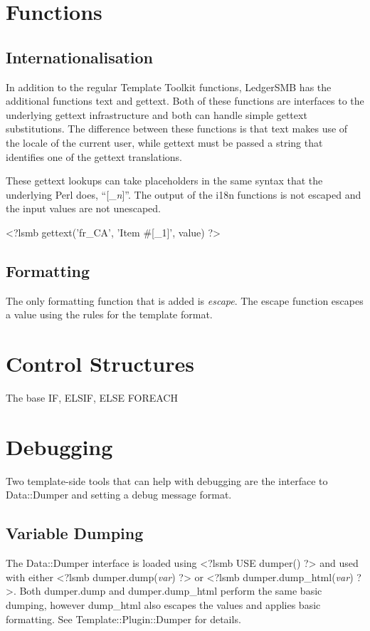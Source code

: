 \documentclass[english]{article}
\newcommand{\pitag}[1]{\textless?lsmb #1 ?\textgreater}
\newcommand{\lsmb}{LedgerSMB }
\begin{document}
\section{Functions}

\subsection{Internationalisation}
In addition to the regular Template Toolkit functions, \lsmb has the
additional functions text and gettext.  Both of these functions are interfaces
to the underlying gettext infrastructure and both can handle simple gettext
substitutions.  The difference between these functions is that text makes use
of the locale of the current user, while gettext must be passed a string that
identifies one of the gettext translations.

These gettext lookups can take placeholders in the same syntax that the
underlying Perl does, ``[\_\emph{n}]''.  The output of the i18n functions is
not escaped and the input values are not unescaped.

\pitag{gettext('fr\_CA', 'Item \#[\_1]', value)}

\subsection{Formatting}

The only formatting function that is added is \emph{escape}.  The escape
function escapes a value using the rules for the template format.

\section{Control Structures}
The base 
IF, ELSIF, ELSE
FOREACH

\section{Debugging}
Two template-side tools that can help with debugging are the interface to
Data::Dumper and setting a debug message format.

\subsection{Variable Dumping}
The Data::Dumper interface is loaded using \pitag{USE dumper()} and used with
either \pitag{dumper.dump(\emph{var})} or \pitag{dumper.dump\_html(\emph{var})}.
Both dumper.dump and dumper.dump\_html perform the same basic dumping, however
dump\_html also escapes the values and applies basic formatting.  See
Template::Plugin::Dumper for details.
\end{document}
